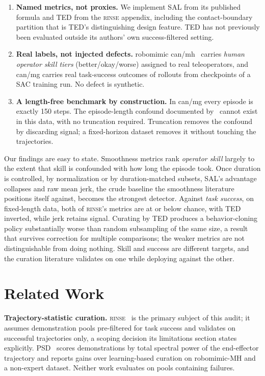 \documentclass[10pt]{article}
\newcommand{\rinse}{\textsc{rinse}}
\begin{document}
\begin{enumerate}
\item \textbf{Named metrics, not proxies.} We implement SAL from its
published formula and TED from the \rinse{} appendix, including the
contact-boundary partition that is TED's distinguishing design feature. TED
has not previously been evaluated outside its authors' own
success-filtered setting.
\item \textbf{Real labels, not injected defects.} robomimic
can/mh~\citep{robomimic} carries \emph{human operator skill tiers}
(better/okay/worse) assigned to real teleoperators, and can/mg carries real
task-success outcomes of rollouts from checkpoints of a SAC training run. No defect
is synthetic.
\item \textbf{A length-free benchmark by construction.} In can/mg every
episode is exactly 150 steps. The episode-length confound documented
by~\citep{bedi-policy} cannot exist in this data, with no truncation
required. Truncation removes the confound by discarding signal; a
fixed-horizon dataset removes it without touching the trajectories.
\end{enumerate}

Our findings are easy to state. Smoothness metrics rank \emph{operator
skill} largely to the extent that skill is confounded with how long the
episode took. Once duration is controlled, by normalization or by
duration-matched subsets, SAL's advantage collapses and raw mean jerk, the
crude baseline the smoothness literature positions itself against, becomes
the strongest detector. Against \emph{task success}, on fixed-length data,
both of \rinse{}'s metrics are at or below chance, with TED inverted, while
jerk retains signal. Curating by TED produces a behavior-cloning policy
substantially worse than random subsampling of the same size, a result that survives correction
for multiple comparisons; the weaker metrics are not distinguishable from
doing nothing. Skill and success are
different targets, and the curation literature validates on one while
deploying against the other.

\section{Related Work}

\textbf{Trajectory-statistic curation.} \rinse{}~\citep{rinse} is the primary
subject of this audit; it assumes demonstration pools pre-filtered for task
success and validates on successful trajectories only, a scoping decision its
limitations section states explicitly. PSD~\citep{psd} scores demonstrations
by total spectral power of the end-effector trajectory and reports gains over
learning-based curation on robomimic-MH and a non-expert dataset. Neither
work evaluates on pools containing failures.
\end{document}
